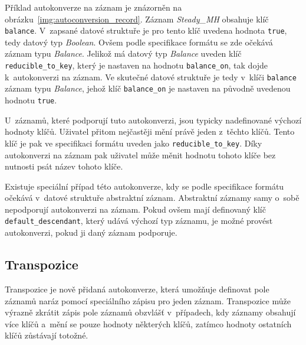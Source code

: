 \documentclass[FM,bw,DP]{tulthesis}
\begin{document}
Příklad autokonverze na záznam je znázorněn na obrázku~\ref{img:autoconversion_record}. Záznam \textit{Steady\_MH} obsahuje klíč \texttt{balance}. V~zapsané datové struktuře je pro tento klíč uvedena hodnota \texttt{true}, tedy datový typ \textit{Boolean}. Ovšem podle specifikace formátu se zde očekává záznam typu \textit{Balance}. Jelikož má datový typ \textit{Balance} uveden klíč \texttt{reducible\_to\_key}, který je nastaven na hodnotu \texttt{balance\_on}, tak dojde k~autokonverzi na záznam. Ve skutečné datové struktuře je tedy v~klíči \texttt{balance} záznam typu \textit{Balance}, jehož klíč \texttt{balance\_on} je nastaven na původně uvedenou hodnotu \texttt{true}.

U~záznamů, které podporují tuto autokonverzi, jsou typicky nadefinované výchozí hodnoty klíčů. Uživatel přitom nejčastěji mění právě jeden z~těchto klíčů. Tento klíč je pak ve specifikaci formátu uveden jako \texttt{reducible\_to\_key}. Díky autokonverzi na záznam pak uživatel může měnit hodnotu tohoto klíče bez nutnosti psát název tohoto klíče.

Existuje speciální případ této autokonverze, kdy se podle specifikace formátu očekává v~datové struktuře abstraktní záznam. Abstraktní záznamy samy o~sobě nepodporují autokonverzi na záznam. Pokud ovšem mají definovaný klíč \texttt{default\_de\-scend\-ant}, který udává výchozí typ záznamu, je možné provést autokonverzi, pokud ji daný záznam podporuje.

\subsection{Transpozice}
\label{sec:analyza-autokonverze-transpozice}
Transpozice je nově přidaná autokonverze, která umožňuje definovat pole záznamů naráz pomocí speciálního zápisu pro jeden záznam. Transpozice může výrazně zkrátit zápis pole záznamů obzvlášť v~případech, kdy záznamy obsahují více klíčů a~mění se pouze hodnoty některých klíčů, zatímco hodnoty ostatních klíčů zůstávají totožné.
\end{document}
